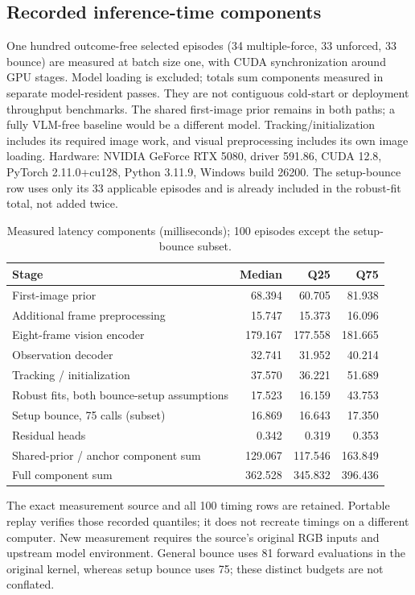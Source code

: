 \subsection{Recorded inference-time components}
One hundred outcome-free selected episodes (34 multiple-force, 33 unforced, 33 bounce) are measured at batch size one, with CUDA synchronization around GPU stages. Model loading is excluded; totals sum components measured in separate model-resident passes. They are not contiguous cold-start or deployment throughput benchmarks. The shared first-image prior remains in both paths; a fully VLM-free baseline would be a different model. Tracking/initialization includes its required image work, and visual preprocessing includes its own image loading. Hardware: NVIDIA GeForce RTX 5080, driver 591.86, CUDA 12.8, PyTorch 2.11.0+cu128, Python 3.11.9, Windows build 26200. The setup-bounce row uses only its 33 applicable episodes and is already included in the robust-fit total, not added twice.
\begin{table}[htbp]\centering\small
\caption{Measured latency components (milliseconds); 100 episodes except the setup-bounce subset.}\label{tab:ext_latency}
\begin{tabular}{lrrr}\toprule
Stage & Median & Q25 & Q75\\\midrule
First-image prior & 68.394 & 60.705 & 81.938\\
Additional frame preprocessing & 15.747 & 15.373 & 16.096\\
Eight-frame vision encoder & 179.167 & 177.558 & 181.665\\
Observation decoder & 32.741 & 31.952 & 40.214\\
Tracking / initialization & 37.570 & 36.221 & 51.689\\
Robust fits, both bounce-setup assumptions & 17.523 & 16.159 & 43.753\\
Setup bounce, 75 calls (subset) & 16.869 & 16.643 & 17.350\\
Residual heads & 0.342 & 0.319 & 0.353\\
Shared-prior / anchor component sum & 129.067 & 117.546 & 163.849\\
Full component sum & 362.528 & 345.832 & 396.436\\
\bottomrule\end{tabular}
\end{table}
The exact measurement source and all 100 timing rows are retained. Portable replay verifies those recorded quantiles; it does not recreate timings on a different computer. New measurement requires the source's original RGB inputs and upstream model environment. General bounce uses 81 forward evaluations in the original kernel, whereas setup bounce uses 75; these distinct budgets are not conflated.

